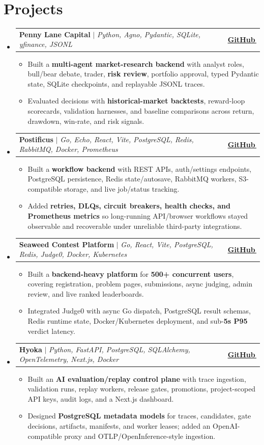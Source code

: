 \documentclass[letterpaper,11pt]{article}
\makeatletter
\newcommand{\bodyhref}[2]{\href{#1}{\underline{#2}\,\faExternalLink*}}
\newcommand{\resumeItem}[1]{\item{\fontsize{9.05pt}{9.75pt}\selectfont #1\vspace{-0.7pt}}}
\newcommand{\resumeProjectHeading}[2]{
    \item
    \begin{tabular*}{1.0\textwidth}{l@{\extracolsep{\fill}}r}
      \small#1 & \textbf{\small #2}\\
    \end{tabular*}\vspace{-4pt}
}
\newcommand{\resumeSubHeadingListStart}{\begin{itemize}[leftmargin=0.0in, label={}, itemsep=0.6pt, topsep=0pt, parsep=0pt, partopsep=0pt]}
\newcommand{\resumeSubHeadingListEnd}{\end{itemize}}
\newcommand{\resumeItemListStart}{\begin{itemize}[leftmargin=0.16in,itemsep=0.3pt,topsep=0.9pt,parsep=0pt,partopsep=0pt]}
\newcommand{\resumeItemListEnd}{\end{itemize}\vspace{-3pt}}
\makeatother
\begin{document}
\section{Projects}
\resumeSubHeadingListStart
\resumeProjectHeading
{\textbf{Penny Lane Capital} $|$ \emph{Python, Agno, Pydantic, SQLite, yfinance, JSONL}}{\bodyhref{https://github.com/unichronic/pennylane}{GitHub}}
\resumeItemListStart
\resumeItem{Built a \textbf{multi-agent market-research backend} with analyst roles, bull/bear debate, trader, \textbf{risk review}, portfolio approval, typed Pydantic state, SQLite checkpoints, and replayable JSONL traces.}
\resumeItem{Evaluated decisions with \textbf{historical-market backtests}, reward-loop scorecards, validation harnesses, and baseline comparisons across return, drawdown, win-rate, and risk signals.}
\resumeItemListEnd
\resumeProjectHeading
{\textbf{Postificus} $|$ \emph{Go, Echo, React, Vite, PostgreSQL, Redis, RabbitMQ, Docker, Prometheus}}{\bodyhref{https://github.com/unichronic/postificus}{GitHub}}
\resumeItemListStart
\resumeItem{Built a \textbf{workflow backend} with REST APIs, auth/settings endpoints, PostgreSQL persistence, Redis state/autosave, RabbitMQ workers, S3-compatible storage, and live job/status tracking.}
\resumeItem{Added \textbf{retries, DLQs, circuit breakers, health checks, and Prometheus metrics} so long-running API/browser workflows stayed observable and recoverable under unreliable third-party integrations.}
\resumeItemListEnd
\resumeProjectHeading
{\textbf{Seaweed Contest Platform} $|$ \emph{Go, React, Vite, PostgreSQL, Redis, Judge0, Docker, Kubernetes}}{\bodyhref{https://github.com/unichronic/seaweed-fe}{GitHub}}
\resumeItemListStart
\resumeItem{Built a \textbf{backend-heavy platform} for \textbf{500+ concurrent users}, covering registration, problem pages, submissions, async judging, admin review, and live ranked leaderboards.}
\resumeItem{Integrated Judge0 with async Go dispatch, PostgreSQL result schemas, Redis runtime state, Docker/Kubernetes deployment, and sub-\textbf{5s P95} verdict latency.}
\resumeItemListEnd
\resumeProjectHeading
{\textbf{Hyoka} $|$ \emph{Python, FastAPI, PostgreSQL, SQLAlchemy, OpenTelemetry, Next.js, Docker}}{\bodyhref{https://github.com/unichronic/hyoka}{GitHub}}
\resumeItemListStart
\resumeItem{Built an \textbf{AI evaluation/replay control plane} with trace ingestion, validation runs, replay workers, release gates, promotions, project-scoped API keys, audit logs, and a Next.js dashboard.}
\resumeItem{Designed \textbf{PostgreSQL metadata models} for traces, candidates, gate decisions, artifacts, manifests, and worker leases; added an OpenAI-compatible proxy and OTLP/OpenInference-style ingestion.}
\resumeItemListEnd
\resumeSubHeadingListEnd
\end{document}
